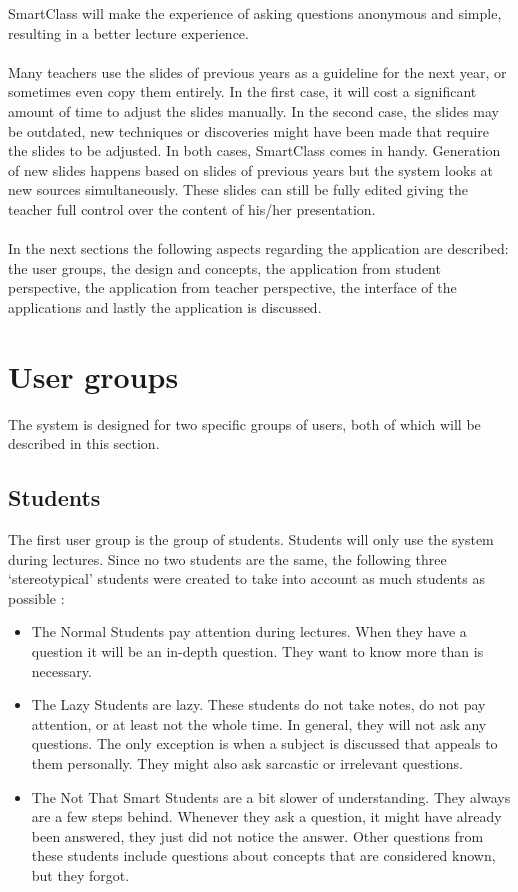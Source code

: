 \documentclass[11pt]{article}
\begin{document}
SmartClass will make the experience of asking questions anonymous and simple, resulting in a better lecture experience.\\\\
Many teachers use the slides of previous years as a guideline for the next year, or sometimes even copy them entirely. In the first case, it will cost a significant amount of time to adjust the slides manually. In the second case, the slides may be outdated, new techniques or discoveries might have been made that require the slides to be adjusted. In both cases, SmartClass comes in handy.  Generation of new slides happens based on slides of previous years but the system looks at new sources simultaneously. These slides can still be fully edited giving the teacher full control over the content of his/her presentation. \\\\
In the next sections the following aspects regarding the application are described: the user groups, the design and concepts, the application from student perspective, the application from teacher perspective, the interface of the applications and lastly the application is discussed. 

\section{User groups}
The system is designed for two specific groups of users, both of which will be described in this section.
\subsection{Students}
The first user group is the group of students. Students will only use the system during lectures. 
Since no two students are the same, the following three `stereotypical' students were created to take into account as much students as possible :
\begin{itemize}
\item The Normal Students pay attention during lectures. When they have a question it will be an in-depth question. They want to know more than is necessary.
\item The Lazy Students are lazy. These students do not take notes, do not pay attention, or at least not the whole time. In general, they will not ask any questions. The only exception is when a subject is discussed that appeals to them personally. They might also ask sarcastic or irrelevant questions.
\item The Not That Smart Students are a bit slower of understanding. They always are a few steps behind. Whenever they ask a question, it might have already been answered, they just did not notice the answer. Other questions from these students include questions about concepts that are considered known, but they forgot.
\end{itemize}
\end{document}
